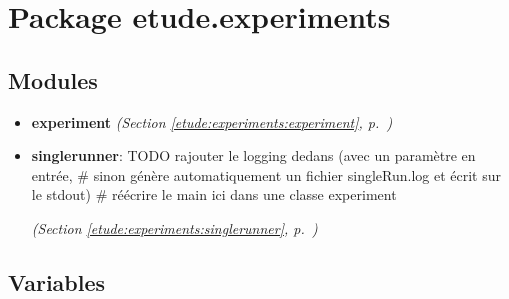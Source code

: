 %
%
%


\section{Package etude.experiments}

    \label{etude:experiments}


\subsection{Modules}

\begin{itemize}
\setlength{\parskip}{0ex}
\item \textbf{experiment}
  \textit{(Section \ref{etude:experiments:experiment}, p.~\pageref{etude:experiments:experiment})}

\item \textbf{singlerunner}: TODO rajouter le logging dedans (avec un paramètre en entrée, \# sinon 
génère automatiquement un fichier singleRun.log et écrit sur le stdout) \# 
réécrire le main ici dans une classe experiment



  \textit{(Section \ref{etude:experiments:singlerunner}, p.~\pageref{etude:experiments:singlerunner})}

\end{itemize}



  \subsection{Variables}

